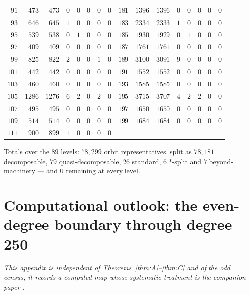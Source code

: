 \documentclass[11pt]{amsart}
\theoremstyle{remark}
\begin{document}
\begin{center}
\begin{tabular}{rrrrrrrr|rrrrrrrr}
$91$ & $473$ & $473$ & $0$ & $0$ & $0$ & $0$ & $0$ & $181$ & $1396$ & $1396$ & $0$ & $0$ & $0$ & $0$ & $0$ \\
$93$ & $646$ & $645$ & $1$ & $0$ & $0$ & $0$ & $0$ & $183$ & $2334$ & $2333$ & $1$ & $0$ & $0$ & $0$ & $0$ \\
$95$ & $539$ & $538$ & $0$ & $1$ & $0$ & $0$ & $0$ & $185$ & $1930$ & $1929$ & $0$ & $1$ & $0$ & $0$ & $0$ \\
$97$ & $409$ & $409$ & $0$ & $0$ & $0$ & $0$ & $0$ & $187$ & $1761$ & $1761$ & $0$ & $0$ & $0$ & $0$ & $0$ \\
$99$ & $825$ & $822$ & $2$ & $0$ & $0$ & $1$ & $0$ & $189$ & $3100$ & $3091$ & $9$ & $0$ & $0$ & $0$ & $0$ \\
$101$ & $442$ & $442$ & $0$ & $0$ & $0$ & $0$ & $0$ & $191$ & $1552$ & $1552$ & $0$ & $0$ & $0$ & $0$ & $0$ \\
$103$ & $460$ & $460$ & $0$ & $0$ & $0$ & $0$ & $0$ & $193$ & $1585$ & $1585$ & $0$ & $0$ & $0$ & $0$ & $0$ \\
$105$ & $1286$ & $1276$ & $6$ & $2$ & $0$ & $2$ & $0$ & $195$ & $3715$ & $3707$ & $4$ & $2$ & $2$ & $0$ & $0$ \\
$107$ & $495$ & $495$ & $0$ & $0$ & $0$ & $0$ & $0$ & $197$ & $1650$ & $1650$ & $0$ & $0$ & $0$ & $0$ & $0$ \\
$109$ & $514$ & $514$ & $0$ & $0$ & $0$ & $0$ & $0$ & $199$ & $1684$ & $1684$ & $0$ & $0$ & $0$ & $0$ & $0$ \\
$111$ & $900$ & $899$ & $1$ & $0$ & $0$ & $0$ & $0$ &  & & & & & & &  \\
\bottomrule
\end{tabular}
\end{center}

\noindent Totals over the $89$ levels: $78{,}299$ orbit representatives, split as
$78{,}181$ decomposable, $79$ quasi-decomposable, $26$ standard, $6$ $*$-split and $7$
beyond-machinery --- and $0$ remaining at every level.

\section{Computational outlook: the even-degree boundary through degree 250}\label{sec:even}

\emph{This appendix is independent of Theorems~\ref{thm:A}--\ref{thm:C} and of the odd census;
it records a computed map whose systematic treatment is the companion paper \cite{BNeven}.}
\end{document}
